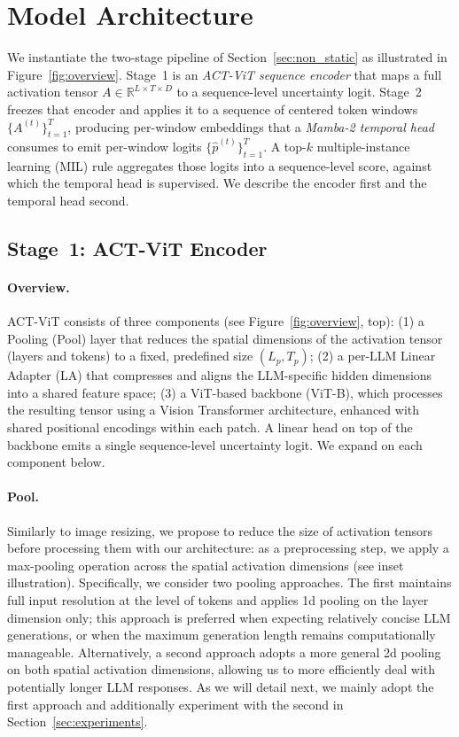 \section{Model Architecture}
\label{sec:model}

We instantiate the two-stage pipeline of
Section~\ref{sec:non_static} as illustrated in
Figure~\ref{fig:overview}. Stage~1 is an \emph{ACT-ViT sequence encoder}
that maps a full activation tensor
$A \in \mathbb{R}^{L \times T \times D}$ to a sequence-level
uncertainty logit. Stage~2 freezes that encoder and applies it to a
sequence of centered token windows $\{A^{(t)}\}_{t=1}^{T}$, producing
per-window embeddings that a \emph{Mamba-2 temporal head}
\citep{albertgu2024} consumes to emit per-window logits
$\{\hat{p}^{(t)}\}_{t=1}^{T}$. A top-$k$ multiple-instance learning
(MIL) rule aggregates those logits into a sequence-level score, against
which the temporal head is supervised. We describe the encoder first
and the temporal head second.

\subsection{Stage~1: ACT-ViT Encoder}
\label{sec:act_vit_subsec}

\paragraph{Overview.} ACT-ViT consists of three components (see
Figure~\ref{fig:overview}, top): (1) a Pooling (Pool) layer that reduces
the spatial dimensions of the activation tensor (layers and tokens) to a
fixed, predefined size $(L_p, T_p)$; (2) a per-LLM Linear Adapter (LA)
that compresses and aligns the LLM-specific hidden dimensions into a
shared feature space; (3) a ViT-based backbone (ViT-B), which processes
the resulting tensor using a Vision Transformer architecture, enhanced
with shared positional encodings within each patch. A linear head on top
of the backbone emits a single sequence-level uncertainty logit. We
expand on each component below.

\paragraph{Pool.} Similarly to image resizing, we propose to reduce the
size of activation tensors before processing them with our architecture:
as a preprocessing step, we apply a max-pooling operation across the
spatial activation dimensions (see inset illustration). Specifically, we
consider two pooling approaches. The first maintains full input
resolution at the level of tokens and applies 1d pooling on the layer
dimension only; this approach is preferred when expecting relatively
concise LLM generations, or when the maximum generation length remains
computationally manageable. Alternatively, a second approach adopts a
more general 2d pooling on both spatial activation dimensions, allowing
us to more efficiently deal with potentially longer LLM responses. As we
will detail next, we mainly adopt the first approach and additionally
experiment with the second in Section~\ref{sec:experiments}.

